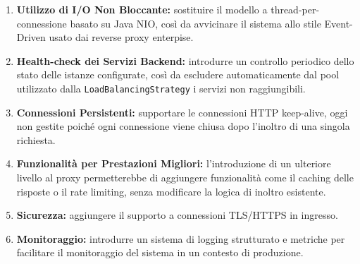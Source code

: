 \begin{enumerate}
    \item \textbf{Utilizzo di I/O Non Bloccante:} sostituire il modello a thread-per-connessione basato su Java NIO, così da avvicinare il sistema allo stile Event-Driven usato dai reverse proxy enterpise.
    \item \textbf{Health-check dei Servizi Backend:} introdurre un controllo periodico dello stato delle istanze configurate, così da escludere automaticamente dal pool utilizzato dalla \texttt{LoadBalancingStrategy} i servizi non raggiungibili.
    \item \textbf{Connessioni Persistenti:} supportare le connessioni HTTP keep-alive, oggi non gestite poiché ogni connessione viene chiusa dopo l'inoltro di una singola richiesta.
    \item \textbf{Funzionalità per Prestazioni Migliori:} l'introduzione di un ulteriore livello al proxy permetterebbe di aggiungere funzionalità come il caching delle risposte o il rate limiting, senza modificare la logica di inoltro esistente.
    \item \textbf{Sicurezza:} aggiungere il supporto a connessioni TLS/HTTPS in ingresso.
    \item \textbf{Monitoraggio:} introdurre un sistema di logging strutturato e metriche per facilitare il monitoraggio del sistema in un contesto di produzione.
\end{enumerate}
